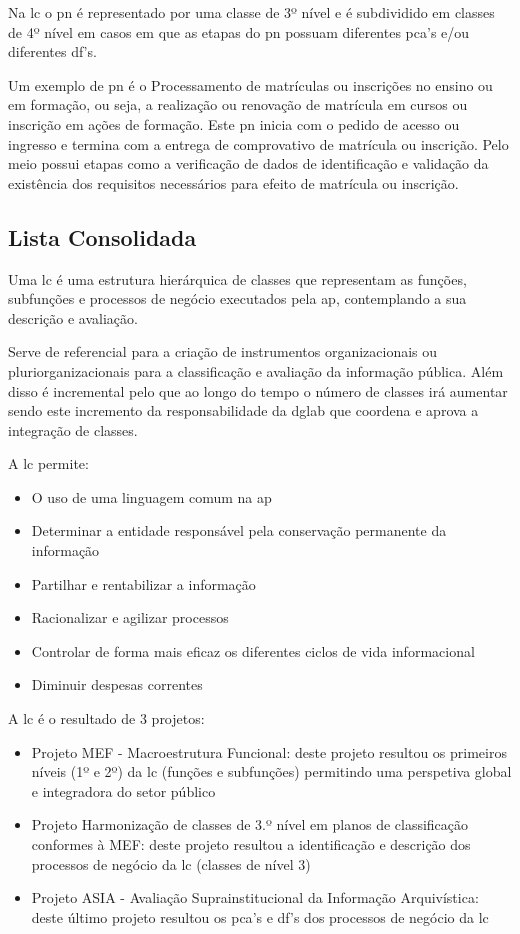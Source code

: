 Na \acrshort{lc} o \acrshort{pn} é representado por uma classe de 3º nível e é subdividido em classes de 4º nível em casos em que as etapas do \acrlong{pn} possuam diferentes \acrshort{pca}'s e/ou diferentes \acrshort{df}'s.

Um exemplo de \acrshort{pn} é o Processamento de matrículas ou inscrições no ensino ou em formação, ou seja, a realização ou renovação de matrícula em cursos ou inscrição em ações de formação. Este \acrshort{pn} inicia com o pedido de acesso ou ingresso e termina com a entrega de comprovativo de matrícula ou inscrição. Pelo meio possui etapas como a verificação de dados de identificação e validação da existência dos requisitos necessários para efeito de matrícula ou inscrição.

\subsection{Lista Consolidada}

Uma \acrfull{lc} é uma estrutura hierárquica de classes que representam as funções, subfunções e processos de negócio executados pela \acrfull{ap}, contemplando a sua descrição e avaliação.~\cite{lc}

Serve de referencial para a criação de instrumentos organizacionais ou pluriorganizacionais para a classificação e avaliação da informação pública. Além disso é incremental pelo que ao longo do tempo o número de classes irá aumentar sendo este incremento da responsabilidade da \acrshort{dglab} que coordena e aprova a integração de classes.

A \acrshort{lc} permite:~\cite{lc}
\begin{itemize}
    \item O uso de uma linguagem comum na \acrshort{ap}
    \item Determinar a entidade responsável pela conservação permanente da informação
    \item Partilhar e rentabilizar a informação
    \item Racionalizar e agilizar processos
    \item Controlar de forma mais eficaz os diferentes ciclos de vida informacional
    \item Diminuir despesas correntes
\end{itemize}

A \acrshort{lc} é o resultado de 3 projetos:
\begin{itemize}
    \item Projeto MEF - Macroestrutura Funcional: deste projeto resultou os primeiros níveis (1º e 2º) da \acrshort{lc} (funções e subfunções) permitindo uma perspetiva global e integradora do setor público
    \item Projeto Harmonização de classes de 3.º nível em planos de classificação conformes à MEF: deste projeto resultou a identificação e descrição dos processos de negócio da \acrshort{lc} (classes de nível 3)
    \item Projeto ASIA - Avaliação Suprainstitucional da Informação Arquivística: deste último projeto resultou os \acrshort{pca}'s e \acrshort{df}'s dos processos de negócio da \acrshort{lc} 
\end{itemize}

